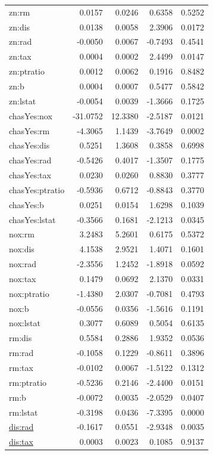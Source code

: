 \documentclass[
]{article}
\begin{document}
\begin{longtable}[]{@{}lrrrr@{}}
zn:rm & 0.0157 & 0.0246 & 0.6358 & 0.5252 \\
zn:dis & 0.0138 & 0.0058 & 2.3906 & 0.0172 \\
zn:rad & -0.0050 & 0.0067 & -0.7493 & 0.4541 \\
zn:tax & 0.0004 & 0.0002 & 2.4499 & 0.0147 \\
zn:ptratio & 0.0012 & 0.0062 & 0.1916 & 0.8482 \\
zn:b & 0.0004 & 0.0007 & 0.5477 & 0.5842 \\
zn:lstat & -0.0054 & 0.0039 & -1.3666 & 0.1725 \\
chasYes:nox & -31.0752 & 12.3380 & -2.5187 & 0.0121 \\
chasYes:rm & -4.3065 & 1.1439 & -3.7649 & 0.0002 \\
chasYes:dis & 0.5251 & 1.3608 & 0.3858 & 0.6998 \\
chasYes:rad & -0.5426 & 0.4017 & -1.3507 & 0.1775 \\
chasYes:tax & 0.0230 & 0.0260 & 0.8830 & 0.3777 \\
chasYes:ptratio & -0.5936 & 0.6712 & -0.8843 & 0.3770 \\
chasYes:b & 0.0251 & 0.0154 & 1.6298 & 0.1039 \\
chasYes:lstat & -0.3566 & 0.1681 & -2.1213 & 0.0345 \\
nox:rm & 3.2483 & 5.2601 & 0.6175 & 0.5372 \\
nox:dis & 4.1538 & 2.9521 & 1.4071 & 0.1601 \\
nox:rad & -2.3556 & 1.2452 & -1.8918 & 0.0592 \\
nox:tax & 0.1479 & 0.0692 & 2.1370 & 0.0331 \\
nox:ptratio & -1.4380 & 2.0307 & -0.7081 & 0.4793 \\
nox:b & -0.0556 & 0.0356 & -1.5616 & 0.1191 \\
nox:lstat & 0.3077 & 0.6089 & 0.5054 & 0.6135 \\
rm:dis & 0.5584 & 0.2886 & 1.9352 & 0.0536 \\
rm:rad & -0.1058 & 0.1229 & -0.8611 & 0.3896 \\
rm:tax & -0.0102 & 0.0067 & -1.5122 & 0.1312 \\
rm:ptratio & -0.5236 & 0.2146 & -2.4400 & 0.0151 \\
rm:b & -0.0072 & 0.0035 & -2.0529 & 0.0407 \\
rm:lstat & -0.3198 & 0.0436 & -7.3395 & 0.0000 \\
\url{dis:rad} & -0.1617 & 0.0551 & -2.9348 & 0.0035 \\
\url{dis:tax} & 0.0003 & 0.0023 & 0.1085 & 0.9137 \\

\end{longtable}
\end{document}
